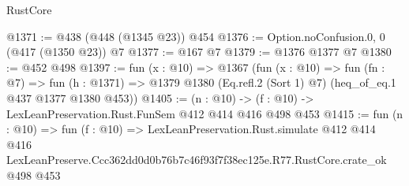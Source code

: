 \begin{lexlean}{RustCore}
\begin{coremodule}
@1371 := @438 (@448 (@1345 @23)) @454
@1376 := Option.noConfusion.{0, 0} (@417 (@1350 @23)) @7
@1377 := @167 @7
@1379 := @1376 @1377 @7
@1380 := @452 @498
@1397 := fun (x : @10) =>
  @1367
    (fun (x : @10) =>
    fun (fn : @7) =>
    fun (h : @1371) => @1379 @1380 (Eq.refl.{2} (Sort 1) @7) (heq_of_eq.{1} @437 @1377 @1380 @453))
@1405 := (n : @10) -> (f : @10) -> LexLeanPreservation.Rust.FunSem @412 @414 @416 @498 @453
@1415 := fun (n : @10) =>
  fun (f : @10) =>
  LexLeanPreservation.Rust.simulate
    @412
    @414
    @416
    LexLeanPreserve.Ccc362dd0d0b76b7c46f93f7f38ec125e.R77.RustCore.crate_ok
    @498
    @453
\end{coremodule}
\end{lexlean}
